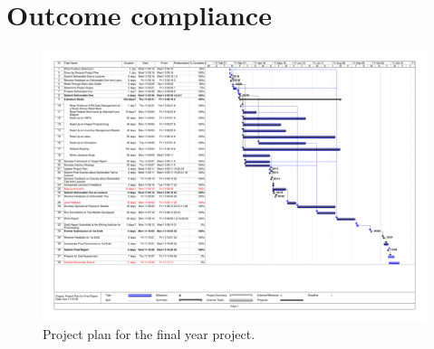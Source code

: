 \chapter{Outcome compliance}
\label{ap:outCompliance}
\graphicspath{{Appendix4/Appendix4figures/}}

\begin{figure}
\centering
\includegraphics[scale=0.55, trim=35 54 35 35, clip, angle=90]{SkripsieProjectPlan_Final}
\caption{Project plan for the final year project.}
\label{fig:ProjectPlan}
\end{figure}


